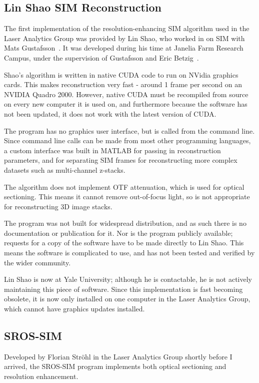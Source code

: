 \subsection{Lin Shao SIM Reconstruction}
The first implementation of the resolution-enhancing SIM algorithm used in the Laser Analytics Group was provided by Lin Shao, who worked in on SIM with Mats Gustafsson~\cite{shao2011super}.
It was developed during his time at Janelia Farm Research Campus, under the supervision of Gustafsson and Eric Betzig~\cite{beach2014nonmuscle}.

Shao's algorithm is written in native CUDA code to run on NVidia graphics cards.
This makes reconstruction very fast - around 1 frame per second on an NVIDIA Quadro 2000. 
However, native CUDA must be recompiled from source on every new computer it is used on, and furthermore because the software has not been updated, it does not work with the latest version of CUDA. 

The program has no graphics user interface, but is called from the command line. 
Since command line calls can be made from most other programming languages, a custom interface was built in MATLAB for passing in reconstruction parameters, and for separating SIM frames for reconstructing more complex datasets such as multi-channel z-stacks. 

The algorithm does not implement OTF attenuation, which is used for optical sectioning.
This means it cannot remove out-of-focus light, so is not appropriate for reconstructing 3D image stacks. 

The program was not built for widespread distribution, and as such there is no documentation or publication for it. 
Nor is the program publicly available; requests for a copy of the software have to be made directly to Lin Shao. 
This means the software is complicated to use, and has not been tested and verified by the wider community. 

Lin Shao is now at Yale University; although he is contactable, he is not actively maintaining this piece of software.
Since this implementation is fast becoming obsolete, it is now only installed on one computer in the Laser Analytics Group, which cannot have graphics updates installed. 

\subsection{SROS-SIM}
Developed by Florian Str\"ohl in the Laser Analytics Group shortly before I arrived, the SROS-SIM program implements both optical sectioning and resolution enhancement. 

